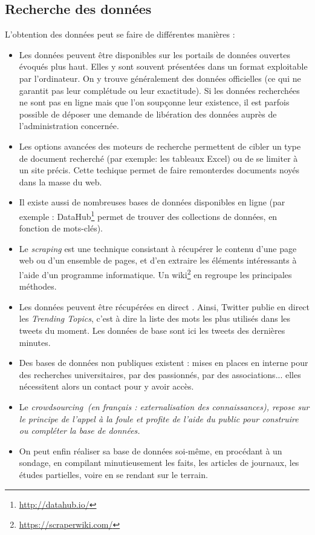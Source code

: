 \subsection{Recherche des données}
L'obtention des données peut se faire de différentes manières :
\begin{itemize}
\item Les données peuvent être disponibles sur les portails de données ouvertes évoqués 
plus haut. Elles y sont souvent présentées dans un format exploitable par l'ordinateur. 
On y trouve généralement des données officielles (ce qui ne garantit pas leur 
complétude ou leur exactitude). Si les données recherchées ne sont pas en ligne mais 
que l'on soupçonne leur existence, il est parfois possible de déposer une demande de \og libération des données \fg auprès de l'administration concernée.
\item Les options avancées des moteurs de recherche permettent de cibler un type de 
document recherché (par exemple: les tableaux Excel) ou de se limiter à un site précis. 
Cette techique permet de faire \og remonter\fg des documents noyés dans la masse du web.
\item Il existe aussi de nombreuses bases de données disponibles en ligne (par exemple : DataHub\footnote{\url{http://datahub.io/}} permet de trouver des collections de données, en fonction de mots-clés).
\item Le \textit{scraping} est une technique consistant à récupérer le contenu d'une page web ou d'un ensemble de pages, et d'en extraire les éléments intéressants à 
l'aide d'un programme informatique. Un wiki\footnote{\url{https://scraperwiki.com/}} en regroupe les principales méthodes.
\item Les données peuvent être récupérées en direct \cite{bradshaw}. Ainsi, Twitter publie en direct les \textit{Trending Topics}, c'est à dire la liste des mots les plus utilisés
dans les tweets du moment. Les données de base sont ici les tweets des dernières minutes.
\item Des bases de données non publiques existent : mises en places en interne pour des recherches universitaires, par des passionnés, par des associations... elles nécessitent alors un contact pour y avoir accès.
\item Le \em crowdsourcing\em\, (en français : externalisation des connaissances), repose sur le principe de \og l'appel à la foule \fg et profite de l'aide du public pour
construire ou compléter la base de données.
\item On peut enfin réaliser sa base de données soi-même, en procédant à un sondage, en compilant minutieusement
les faits, les articles de journaux, les études partielles, voire en se rendant sur le terrain.
\end{itemize}

